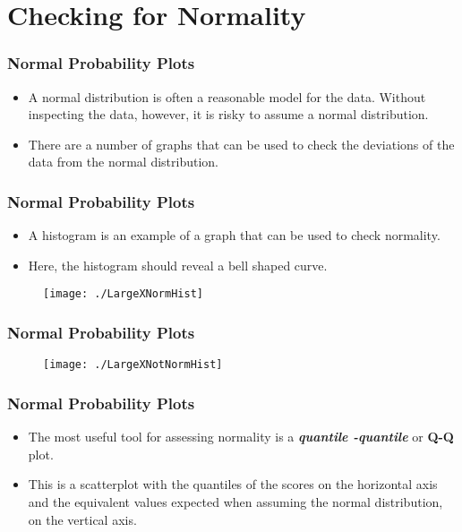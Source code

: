 \documentclass{beamer}
\begin{document}
\section*{Checking for Normality}
\begin{frame}
\frametitle{Normal Probability Plots}
\Large
\begin{itemize}
\item A normal distribution is often a reasonable model for the data. Without inspecting the data, however, it is risky to assume a normal distribution. 

\item There are a number of graphs that can be used to check the deviations of the data from the normal distribution. 

\end{itemize}

\end{frame}
\begin{frame}
\frametitle{Normal Probability Plots}
\Large
\begin{itemize}
\item A histogram is an example of a graph that can be used to check normality. \item Here, the histogram should reveal a bell shaped curve. 
\end{itemize}
\begin{figure}
\centering
\texttt{[image: ./LargeXNormHist]}
\label{fig:LargeXNormHist}
\end{figure}

\end{frame}
\begin{frame}
\frametitle{Normal Probability Plots}
\Large

\begin{figure}
\centering
\texttt{[image: ./LargeXNotNormHist]}
\label{fig:LargeXNotNormHist}
\end{figure}

\end{frame}
\begin{frame}
\frametitle{Normal Probability Plots}
\Large
\begin{itemize}

\item The most useful tool for assessing normality is a \textit{\textbf{quantile -quantile}} or \textbf{Q-Q} plot. \item This is a scatterplot with the quantiles of the scores on the horizontal axis and the equivalent values expected when assuming the normal distribution, on the vertical axis. 
\end{itemize}
\end{frame}
\end{document}
